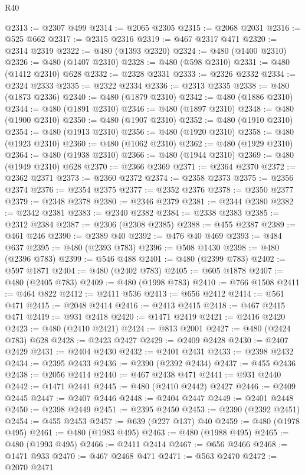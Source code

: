 \begin{lexlean}{R40}
\begin{coremodule}
@2313 := @2307 @499
@2314 := @2065 @2305
@2315 := @2068 @2031
@2316 := @525 @662
@2317 := @2315 @2316
@2319 := @467 @2317 @471
@2320 := @2314 @2319
@2322 := @480 (@1393 @2320)
@2324 := @480 (@1400 @2310)
@2326 := @480 (@1407 @2310)
@2328 := @480 (@598 @2310)
@2331 := @480 (@1412 @2310) @628
@2332 := @2328 @2331
@2333 := @2326 @2332
@2334 := @2324 @2333
@2335 := @2322 @2334
@2336 := @2313 @2335
@2338 := @480 (@1873 @2336)
@2340 := @480 (@1879 @2310)
@2342 := @480 (@1886 @2310)
@2344 := @480 (@1891 @2310)
@2346 := @480 (@1897 @2310)
@2348 := @480 (@1900 @2310)
@2350 := @480 (@1907 @2310)
@2352 := @480 (@1910 @2310)
@2354 := @480 (@1913 @2310)
@2356 := @480 (@1920 @2310)
@2358 := @480 (@1923 @2310)
@2360 := @480 (@1062 @2310)
@2362 := @480 (@1929 @2310)
@2364 := @480 (@1938 @2310)
@2366 := @480 (@1944 @2310)
@2369 := @480 (@1949 @2310) @628
@2370 := @2366 @2369
@2371 := @2364 @2370
@2372 := @2362 @2371
@2373 := @2360 @2372
@2374 := @2358 @2373
@2375 := @2356 @2374
@2376 := @2354 @2375
@2377 := @2352 @2376
@2378 := @2350 @2377
@2379 := @2348 @2378
@2380 := @2346 @2379
@2381 := @2344 @2380
@2382 := @2342 @2381
@2383 := @2340 @2382
@2384 := @2338 @2383
@2385 := @2312 @2384
@2387 := @2306 (@2308 @2385)
@2388 := @455 @2387
@2389 := @461 @246
@2390 := @2389 @40
@2392 := @476 @40 @469
@2393 := @484 @637
@2395 := @480 (@2393 @783)
@2396 := @508 @1430
@2398 := @480 (@2396 @783)
@2399 := @546 @488
@2401 := @480 (@2399 @783)
@2402 := @597 @1871
@2404 := @480 (@2402 @783)
@2405 := @605 @1878
@2407 := @480 (@2405 @783)
@2409 := @480 (@1998 @783)
@2410 := @766 @1508
@2411 := @464 @822
@2412 := @2411 @536
@2413 := @656 @2412
@2414 := @561 @471
@2415 := @2048 @2414
@2416 := @2413 @2415
@2418 := @467 @2415 @471
@2419 := @931 @2418
@2420 := @1471 @2419
@2421 := @2416 @2420
@2423 := @480 (@2410 @2421)
@2424 := @813 @2001
@2427 := @480 (@2424 @783) @628
@2428 := @2423 @2427
@2429 := @2409 @2428
@2430 := @2407 @2429
@2431 := @2404 @2430
@2432 := @2401 @2431
@2433 := @2398 @2432
@2434 := @2395 @2433
@2436 := @2390 (@2392 @2434)
@2437 := @455 @2436
@2438 := @2056 @2414
@2440 := @467 @2438 @471
@2441 := @931 @2440
@2442 := @1471 @2441
@2445 := @480 (@2410 @2442) @2427
@2446 := @2409 @2445
@2447 := @2407 @2446
@2448 := @2404 @2447
@2449 := @2401 @2448
@2450 := @2398 @2449
@2451 := @2395 @2450
@2453 := @2390 (@2392 @2451)
@2454 := @455 @2453
@2457 := @639 (@227 @137) @40
@2459 := @480 (@1978 @495)
@2461 := @480 (@1983 @495)
@2463 := @480 (@1988 @495)
@2465 := @480 (@1993 @495)
@2466 := @2411 @2414
@2467 := @656 @2466
@2468 := @1471 @933
@2470 := @467 @2468 @471
@2471 := @563 @2470
@2472 := @2070 @2471

\end{coremodule}
\end{lexlean}
